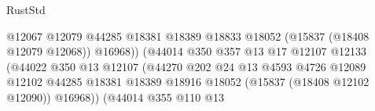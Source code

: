 \begin{lexlean}{RustStd}
\begin{coremodule}
                                                            @12067
                                                            @12079
                                                            @44285
                                                            @18381
                                                            @18389
                                                            @18833
                                                            @18052
                                                            (@15837 (@18408 @12079 @12068))
                                                            @16968))
                                                        (@44014
                                                          @350
                                                          @357
                                                          @13
                                                          @17
                                                          @12107
                                                          @12133
                                                          (@44022
                                                            @350
                                                            @13
                                                            @12107
                                                            (@44270
                                                              @202
                                                              @24
                                                              @13
                                                              @4593
                                                              @4726
                                                              @12089
                                                              @12102
                                                              @44285
                                                              @18381
                                                              @18389
                                                              @18916
                                                              @18052
                                                              (@15837 (@18408 @12102 @12090))
                                                              @16968))
                                                          (@44014
                                                            @355
                                                            @110
                                                            @13

\end{coremodule}
\end{lexlean}
